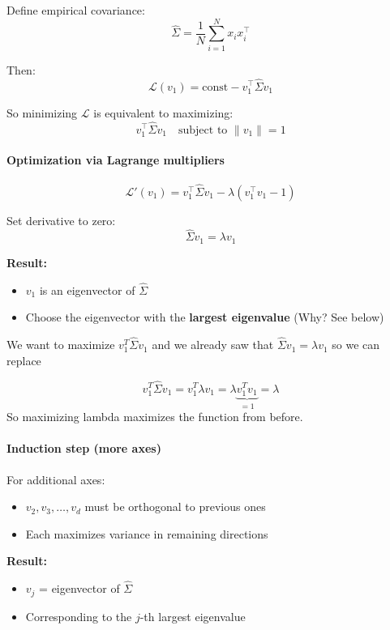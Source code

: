 \documentclass{article}
\begin{document}
Define empirical covariance:
\[
\hat{\Sigma} = \frac{1}{N} \sum_{i=1}^N x_i x_i^\top
\]

Then:
\[
\mathcal{L}(v_1) = \text{const} - v_1^\top \hat{\Sigma} v_1
\]

So minimizing $\mathcal{L}$ is equivalent to maximizing:
\[
v_1^\top \hat{\Sigma} v_1
\quad \text{subject to } \|v_1\| = 1
\]

\vspace{0.5em}
\paragraph{Optimization via Lagrange multipliers}

\[
\mathcal{L}'(v_1) = v_1^\top \hat{\Sigma} v_1 - \lambda (v_1^\top v_1 - 1)
\]

Set derivative to zero:
\[
\hat{\Sigma} v_1 = \lambda v_1
\]

\textbf{Result:}
\begin{itemize}
    \item $v_1$ is an eigenvector of $\hat{\Sigma}$
    \item Choose the eigenvector with the \textbf{largest eigenvalue} (Why? See below)
\end{itemize}
We want to maximize $v_1^T\hat{\Sigma}v_1$ and we already saw that $\hat{\Sigma}v_1 = \lambda v_1$ so we can replace

\[v_1^T\hat{\Sigma}v_1 = v_1^T\lambda v_1 = \lambda \underbrace{v_1^Tv_1}_{=1} = \lambda\]
So maximizing lambda maximizes the function from before.

\vspace{0.5em}
\paragraph{Induction step (more axes)}

For additional axes:
\begin{itemize}
    \item $v_2, v_3, \dots, v_d$ must be orthogonal to previous ones
    \item Each maximizes variance in remaining directions
\end{itemize}

\textbf{Result:}
\begin{itemize}
    \item $v_j$ = eigenvector of $\hat{\Sigma}$
    \item Corresponding to the $j$-th largest eigenvalue
\end{itemize}
\end{document}
